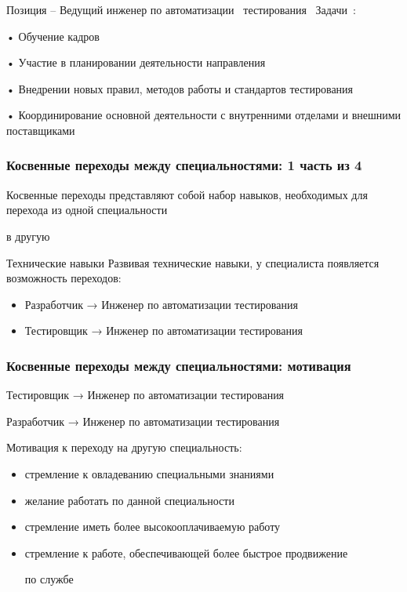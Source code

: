 \documentclass{../industrial-development}
\begin{document}
\lecturenotes

Позиция – Ведущий  инженер по автоматизации~\cite{hh} тестирования~\cite{itcf}
Задачи~\cite{rab}:

•	Обучение кадров

•	Участие в планировании деятельности направления

•	Внедрении новых правил, методов работы и стандартов тестирования

•	Координирование основной деятельности с внутренними отделами и внешними поставщиками





\begin{frame} \frametitle{Косвенные переходы между специальностями: 1 часть из 4}


Косвенные переходы представляют собой набор навыков, необходимых для перехода из одной специальности 

в другую

 \bigskip
 \begin{block}{Технические навыки}
 Развивая \alert{технические навыки}, у специалиста появляется возможность переходов: 
\begin{itemize}
  \item Разработчик → Инженер по автоматизации тестирования
  \item Тестировщик → Инженер по автоматизации тестирования
  \end{itemize}
  \end{block}
\end{frame}


\begin{frame} \frametitle{Косвенные переходы между специальностями: мотивация }

 \begin{block}{Тестировщик →  Инженер по автоматизации тестирования  

Разработчик →  Инженер по автоматизации тестирования }
Мотивация к переходу на другую специальность:
  \end{block}
\begin{itemize}
\item стремление к овладеванию специальными знаниями
\item желание работать по данной специальности
\item стремление иметь более высокооплачиваемую работу 
\item стремление к работе, обеспечивающей более быстрое продвижение 

по службе
  \end{itemize}
\end{frame}
\end{document}
